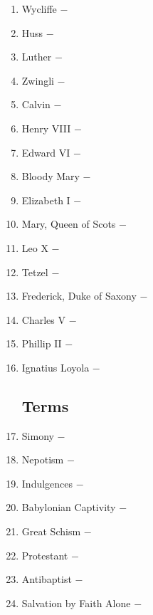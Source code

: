 \documentclass[12pt]{article}
\begin{document}
\begin{enumerate}
\item Wycliffe $-$ 

\item Huss $-$ 

\item Luther $-$ 

\item Zwingli $-$ 

\item Calvin $-$ 

\item Henry VIII $-$ 

\item Edward VI $-$ 

\item Bloody Mary $-$ 

\item Elizabeth I $-$ 

\item Mary, Queen of Scots $-$

\item Leo X $-$ 

\item Tetzel $-$ 

\item Frederick, Duke of Saxony $-$ 

\item Charles V $-$

\item Phillip II $-$

\item Ignatius Loyola $-$

\subsection{Terms}

\item Simony $-$

\item Nepotism $-$

\item Indulgences $-$

\item Babylonian Captivity $-$

\item Great Schism $-$ 

\item Protestant $-$

\item Antibaptist $-$

\item Salvation by Faith Alone $-$


\end{enumerate}
\end{document}
